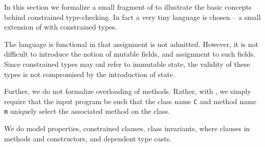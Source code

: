 In this section we formalize a small fragment of \Xten{} to illustrate
the basic concepts behind constrained type-checking. In fact a very
tiny language is chosen -- a small extension of \FJ{} with constrained
types. 

The language is functional in that assignment is not
admitted. However, it is not difficult to introduce the notion of
mutable fields, and assignment to such fields. Since constrained types
may onl refer to immutable state, the validity of these types is not
compromised by the introduction of state.

Further, we do not formalize overloading of methods. Rather, with
\FJ{}, we simply require that the input program be such that the class
name {\tt C} and method name {\tt m} uniquely select the associated
method on the class. 

We do model properties, constrained clauses, class invariants, where
clauses in methods and constructors, and dependent type casts.


